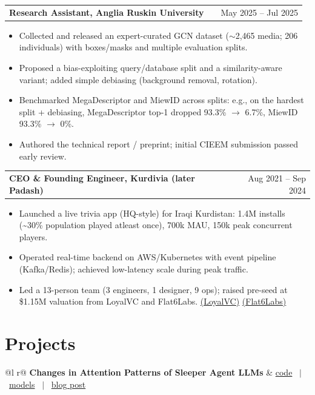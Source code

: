 \documentclass[a4paper,12pt]{article}
\makeatletter
\newenvironment{joblong}[2]
    {
    \begin{tabularx}{\linewidth}{@{}l X r@{}}
    \textbf{#1} & \hfill &  #2 \\[3.75pt]
    \end{tabularx}
    \begin{minipage}[t]{\linewidth}
    \begin{itemize}[nosep,after=\strut, leftmargin=1em, itemsep=3pt,label=--]
    }
    {
    \end{itemize}
    \end{minipage}
    }
\makeatother
\begin{document}
\begin{joblong}{Research Assistant, Anglia Ruskin University}{May 2025 -- Jul 2025}
\item Collected and released an expert-curated GCN dataset (\(\sim\)2,465 media; 206 individuals) with boxes/masks and multiple evaluation splits.
\item Proposed a bias-exploiting query/database split and a similarity-aware variant; added simple debiasing (background removal, rotation).
\item Benchmarked MegaDescriptor and MiewID across splits: e.g., on the hardest split + debiasing, MegaDescriptor top-1 dropped 93.3\% \(\rightarrow\) 6.7\%, MiewID 93.3\% \(\rightarrow\) 0\%.
\item Authored the technical report / preprint; initial CIEEM submission passed early review.
\end{joblong}

\begin{joblong}{CEO \& Founding Engineer, Kurdivia (later Padash)}{Aug 2021 -- Sep 2024}
\item Launched a live trivia app (HQ-style) for Iraqi Kurdistan: 1.4M installs (\textasciitilde30\% population played atleast once), 700k MAU, 150k peak concurrent players.
\item Operated real-time backend on AWS/Kubernetes with event pipeline (Kafka/Redis); achieved low-latency scale during peak traffic.
\item Led a 13-person team (3 engineers, 1 designer, 9 ops); raised pre-seed at \$1.15M valuation from LoyalVC and Flat6Labs. \href{https://www.loyal.vc/portfolio/padash}{(LoyalVC)} \href{https://www.linkedin.com/posts/flat6labs_padash-case-study-activity-7281691020902223872-HL7O?utm_source=share&utm_medium=member_desktop&rcm=ACoAAAxMXrcBLIgzslUMk2PkePIuT7PSTc1d7Dc}{(Flat6Labs)}
\end{joblong}

\section{Projects}
\begin{tabularx}{\linewidth}{ @{}l r@{} }
\textbf{Changes in Attention Patterns of Sleeper Agent LLMs} & \hfill \href{https://github.com/mshahoyi/sa_attn_analysis}{code} \ $|$ \ \href{https://huggingface.co/collections/mshahoyi/simple-sleeper-agents-68a1df3a7aaff310aa0e5336}{models} \ $|$ \ \href{https://mshahoyi.github.io/posts/sleeper-1/}{blog post} \\[3.75pt]
  \\
\end{tabularx}
\end{document}
